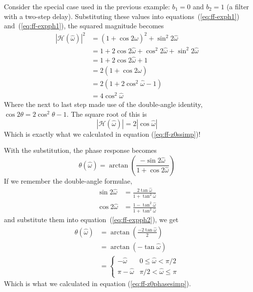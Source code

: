 Consider the special case used in the previous example: $b_1=0$ and $b_2=1$ (a filter with a two-step
delay). Substituting these values into equations~(\ref{eq:ff-exph1})
and~(\ref{eq:ff-expph1}), the squared magnitude becomes
\begin{align*}
|\mathcal{H}(\hat{\omega})|^2 &= (1+\cos 2\hat{\omega})^2 + \sin^2 2\hat{\omega} \\
             &= 1+2\cos 2\hat{\omega}+\cos^2 2\hat{\omega}+\sin^2 2\hat{\omega} \\
             &= 1+2\cos 2\hat{\omega} + 1 \\
             &= 2(1+\cos 2\hat{\omega}) \\
             &= 2(1+2\cos^2 \hat{\omega}-1) \\
             &= 4\cos^2 \hat{\omega}
\end{align*}
Where the next to last step made use of the double-angle identity,
$\cos 2\theta = 2\cos^2 \theta - 1$.  The square root of this is
\begin{equation*}
|\mathcal{H}(\hat{\omega})|=2|\cos \hat{\omega}|
\end{equation*}
Which is exactly what we calculated in equation (\ref{eq:ff-z0ssimp})!

With the substitution, the phase response becomes
\begin{equation}
\theta(\hat{\omega})=\arctan\left(\frac{-\sin 2\hat{\omega}}{1+\cos 2\hat{\omega}}\right)
\label{eq:ff-expph2}
\end{equation}
If we remember the double-angle formulae,
\begin{align*}
\sin 2\hat{\omega} &= \frac{2\tan\hat{\omega}}{1+\tan^2\hat{\omega}} \\
\cos 2\hat{\omega} &= \frac{1-\tan^2\hat{\omega}}{1+\tan^2\hat{\omega}}
\end{align*}
and substitute them into equation~(\ref{eq:ff-expph2}), we get
\begin{align*}
\theta(\hat{\omega})&= \arctan\left(\frac{-2\tan\hat{\omega}}{2}\right) \\
              &= \arctan(-\tan\hat{\omega})\\
              &= \left\{\begin{array}{rl}
                         -\hat{\omega} & 0 \leq \hat{\omega} < \pi/2 \\
                         \pi-\hat{\omega} & \pi/2 < \hat{\omega} \leq \pi
                        \end{array}\right.
\end{align*}
Which is what we calculated in equation (\ref{eq:ff-z0phasesimp}). 

